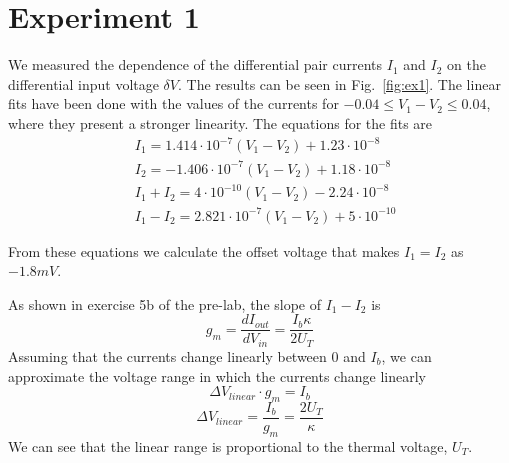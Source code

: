 

\newcommand{\reffig}[1]{Fig.~\ref{#1}}



\newpage
\section{Experiment 1}

We measured the dependence of the differential pair currents \(I_1\) and \(I_2\) on the differential input voltage \(\delta V\). The results can be seen in \reffig{fig:ex1}. The linear fits have been done with the values of the currents for \(-0.04 \le V_1-V_2 \le 0.04\), where they present a stronger linearity. The equations for the fits are
\begin{align*}
&I_1  = 1.414\cdot10^{-7}(V_1-V_2 )+1.23\cdot10^{-8} \\
&I_2  = -1.406\cdot10^{-7}(V_1-V_2 )+1.18\cdot10^{-8} \\
&I_1+I_2  = 4\cdot10^{-10}(V_1-V_2 )-2.24\cdot10^{-8} \\
&I_1-I_2  = 2.821\cdot10^{-7}(V_1-V_2 )+5\cdot10^{-10}
\end{align*}

From these equations we calculate the offset voltage that makes \(I_1=I_2\) as \(-1.8 mV\). 

As shown in exercise 5b of the pre-lab, the slope of \(I_1-I_2\) is
\begin{equation*}
g_m = \frac{dI_{out}}{dV_{in}} = \frac{I_b\kappa}{2U_T}
\end{equation*}
%
Assuming that the currents change linearly between 0 and \(I_b\), we can approximate the voltage range in which the currents change linearly
\begin{equation*}
\Delta V_{linear} \cdot g_m = I_b
\end{equation*}
\begin{equation*}
\Delta V_{linear} = \frac{I_b}{g_m}=\frac{2U_T}{\kappa}
\end{equation*}
We can see that the linear range is proportional to the thermal voltage, \(U_T\).

